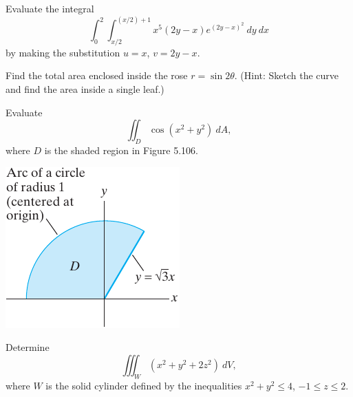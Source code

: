 \documentclass[boxes]{gsypset}
\begin{document}

\begin{problem}[Colley 5.5.9]
	Evaluate the integral
	\[
		\int_0^2\int_{x/2}^{(x/2)+1}x^5(2y-x)e^{(2y-x)^2}~dy~dx
	\]
	by making the substitution $u=x$, $v=2y-x$.
\end{problem}
\begin{solution}
	
\end{solution}

\begin{problem}[Colley 5.5.20]
	Find the total area enclosed inside the rose $r=\sin
	2\theta$. (Hint: Sketch the curve and find the area inside a
	single leaf.)
\end{problem}
\begin{solution}
	
\end{solution}

\begin{problem}[Colley 5.5.25]
	Evaluate
	\[
		\iint_D\cos(x^2+y^2)~dA,
	\]
	where $D$ is the shaded region in Figure 5.106.
	\begin{center}
		\includegraphics{img/5_5_25}
		\renewcommand{\thefigure}{5.106}
	\end{center}
\end{problem}
\begin{solution}
	
\end{solution}

\begin{problem}[Colley 5.5.31]
	Determine
	\[
		\iiint_W(x^2+y^2+2z^2)~dV,
	\]
	where $W$ is the solid cylinder defined by the inequalities
	$x^2+y^2\leq4$, $-1\leq z\leq2$.
\end{problem}
\begin{solution}
	
\end{solution}
\end{document}
